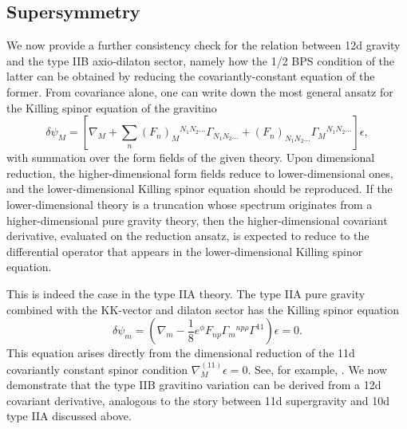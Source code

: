 \subsection{Supersymmetry}
We now provide a further consistency check for the relation between 12d gravity and the type IIB axio-dilaton sector, namely how the 1/2 BPS condition of the latter can be obtained by reducing the covariantly-constant equation of the former.
From covariance alone, one can write down the most general ansatz for the Killing spinor equation of the gravitino
\begin{equation}
\delta\psi_M
= 
\left[
\nabla_M+\sum_n(F_{n})_M{}^{N_1N_2...}\Gamma_{N_1 N_2...} 
+ (F_{n})_{N_1N_2...}\Gamma_M{}^{N_1N_2...}
\right]\epsilon,
\end{equation}
with summation over the form fields of the given theory.
Upon dimensional reduction, the higher-dimensional form fields reduce to lower-dimensional ones, and the lower-dimensional Killing spinor equation should be reproduced.
If the lower-dimensional theory is a truncation whose spectrum originates from a higher-dimensional pure gravity theory, then the higher-dimensional covariant derivative, evaluated on the reduction ansatz, is expected to reduce to the differential operator that appears in the lower-dimensional Killing spinor equation.

This is indeed the case in the type IIA theory.
The type IIA pure gravity combined with the KK-vector and dilaton sector has the Killing spinor equation
\begin{equation}
\delta \psi_m =
\left(
\nabla_m - \frac{1}{8}e^\phi F_{np}\Gamma_m{}^{np\rho} \Gamma^{11}
\right)\epsilon = 0.
\label{IIA Killing spinor equation}
\end{equation}
This equation arises directly from the dimensional reduction of the 11d covariantly constant spinor condition $\nabla^{(11)}_M\epsilon = 0$. See, for example, \cite{Becker:2006dvp}.
We now demonstrate that the type IIB gravitino variation can be derived from a 12d covariant derivative, analogous to the story between 11d supergravity and 10d type IIA discussed above.

